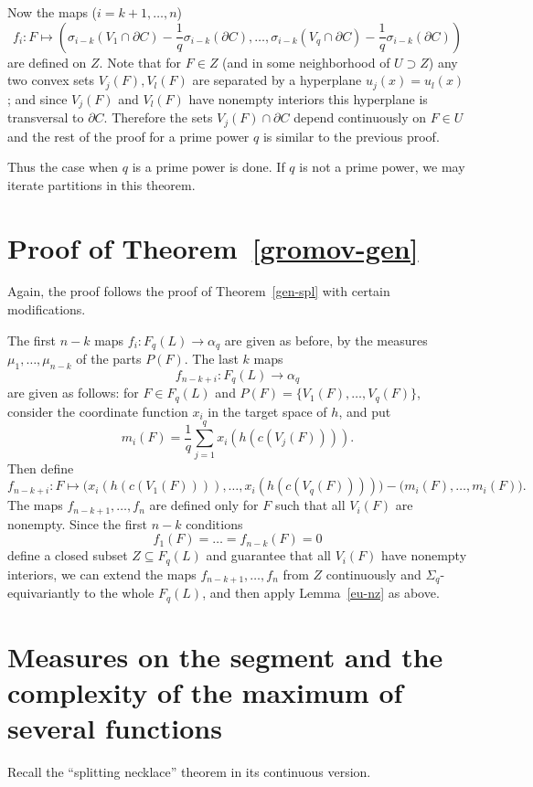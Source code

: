 \documentclass[12pt,a4paper,oneside]{amsart}
\theoremstyle{definition}
\theoremstyle{remark}
\numberwithin{equation}{section}
\newcommand{\Sg}{\Sigma}
\begin{document}
Now the maps ($i=k+1, \ldots, n$)
$$
f_i : F\mapsto \left(\sigma_{i-k}(V_1\cap\partial C) - \frac{1}{q}\sigma_{i-k}(\partial C), \ldots, \sigma_{i-k}(V_q\cap\partial C) - \frac{1}{q}\sigma_{i-k}(\partial C)\right)
$$
are defined on $Z$. Note that for $F\in Z$ (and in some neighborhood of $U\supset Z$) any two convex sets $V_j(F), V_l(F)$ are separated by a hyperplane $u_j(x) = u_l(x)$; and since $V_j(F)$ and $V_l(F)$ have nonempty interiors this hyperplane is transversal to $\partial C$. Therefore the sets $V_j(F)\cap\partial C$ depend continuously on $F\in U$ and the rest of the proof for a prime power $q$ is similar to the previous proof.

Thus the case when $q$ is a prime power is done. If $q$ is not a prime power, we may iterate partitions in this theorem.

\section{Proof of Theorem~\ref{gromov-gen}}

Again, the proof follows the proof of Theorem~\ref{gen-spl} with certain modifications.

The first $n-k$ maps $f_i : F_q(L)\to \alpha_q$ are given as before, by the measures $\mu_1,\ldots, \mu_{n-k}$ of the parts $P(F)$. The last $k$ maps
$$
f_{n-k+i} : F_q(L) \to \alpha_q
$$
are given as follows: for $F\in F_q(L)$ and $P(F) = \{V_1(F), \ldots, V_q(F)\}$, consider the coordinate function $x_i$ in the target space of $h$, and put
$$
m_i(F) = \frac{1}{q} \sum_{j=1}^q x_i(h(c(V_j(F)))).
$$
Then define 
$$
f_{n-k+i} : F \mapsto \big(x_i(h(c(V_1(F)))), \ldots, x_i(h(c(V_q(F))))\big) - \big(m_i(F), \ldots, m_i(F)\big).
$$
The maps $f_{n-k+1}, \ldots, f_n$ are defined only for $F$ such that all $V_i(F)$ are nonempty. Since the first $n-k$ conditions 
$$
f_1(F) = \dots = f_{n-k}(F) = 0
$$
define a closed subset $Z\subseteq F_q(L)$ and guarantee that all $V_i(F)$ have nonempty interiors, we can extend the maps $f_{n-k+1}, \ldots, f_n$ from $Z$ continuously and $\Sg_q$-equivariantly to the whole $F_q(L)$, and then apply Lemma~\ref{eu-nz} as above.

\section{Measures on the segment and the complexity of the maximum of several functions}
\label{one-dim-sec}

Recall the ``splitting necklace'' theorem in its continuous version.
\end{document}
